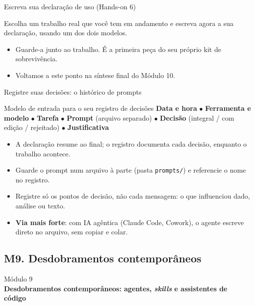 \documentclass[11pt,aspectratio=169,t]{beamer}
\newcommand{\transicao}[2]{%
  \begin{frame}[plain]
    \centering
    \vspace*{2.2cm}
    {\large\color{cinzaescuro} #1}\\[0.8cm]
    {\Large\color{azulUNI}\textbf{#2}}
  \end{frame}}
\begin{document}
\begin{frame}{Escreva sua declaração de uso (Hands-on 6)}
  \begin{block}{}
    \centering Escolha um trabalho real que você tem em andamento e escreva agora a sua declaração, usando um dos dois modelos.
  \end{block}
  \vfill
  \begin{itemize}
    \item Guarde-a junto ao trabalho. É a primeira peça do seu próprio kit de sobrevivência.
    \item Voltamos a este ponto na síntese final do Módulo 10.
  \end{itemize}
\end{frame}

\begin{frame}{Registre suas decisões: o histórico de prompts}
  \begin{exampleblock}{Modelo de entrada para o seu registro de decisões}
    \small \textbf{Data e hora} $\bullet$ \textbf{Ferramenta e modelo} $\bullet$ \textbf{Tarefa} $\bullet$ \textbf{Prompt} (arquivo separado) $\bullet$ \textbf{Decisão} (integral / com edição / rejeitado) $\bullet$ \textbf{Justificativa}
  \end{exampleblock}
  \pause
  \vfill
  \footnotesize
  \begin{itemize}
    \item A declaração resume ao final; o registro documenta cada decisão, enquanto o trabalho acontece.
    \item Guarde o prompt num arquivo à parte (pasta \texttt{prompts/}) e referencie o nome no registro.
    \item Registre só os pontos de decisão, não cada mensagem: o que influenciou dado, análise ou texto.
    \item \textbf{Via mais forte}: com IA agêntica (Claude Code, Cowork), o agente escreve direto no arquivo, sem copiar e colar.
  \end{itemize}
\end{frame}

\subsection{M9. Desdobramentos contemporâneos}
\transicao{Módulo 9}{Desdobramentos contemporâneos: agentes, \textit{skills} e assistentes de código}
\end{document}
